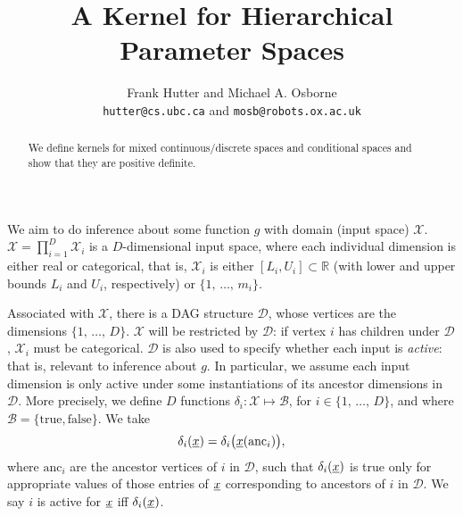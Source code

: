\documentclass[letterpaper]{article}
\newcommand{\vect}[1]{\underline{\smash{#1}}}
\renewcommand{\v}[1]{\vect{#1}}
\newcommand{\reals}{\mathds{R}}
\newcommand{\sX}{\mathcal{X}}
\newcommand{\sD}{\mathcal{D}}
\begin{document}
\title{A Kernel for Hierarchical Parameter Spaces}

\author{Frank Hutter and Michael A. Osborne\\
{\tt hutter@cs.ubc.ca} and {\tt mosb@robots.ox.ac.uk}
}

\maketitle
\begin{abstract}
\noindent{}We define kernels for mixed continuous/discrete spaces and conditional spaces and show that they are positive definite.
\end{abstract}

We aim to do inference about some function $g$ with domain (input space) $\sX$. $\sX = \prod_{i=1}^D \sX_i$ is a $D$-dimensional input space, where each individual dimension is either real or categorical, that is, $\sX_i$ is either $[L_i, U_i] \subset \reals$ (with lower and upper bounds $L_i$ and $U_i$, respectively) or $\{1,\,\ldots,\,m_i\}$. 

Associated with $\sX$, there is a DAG structure $\sD$, whose vertices are the dimensions $\{1,\,\ldots,\,D\}$. $\sX$ will be restricted by $\sD$: if vertex $i$ has children under $\sD$, $\sX_i$ must be categorical. $\sD$ is also used to specify whether each input is \emph{active}: that is, relevant to inference about $g$. In particular, we assume each input dimension is only active under some instantiations of its ancestor dimensions in $\sD$. More precisely, we define $D$ functions $\delta_i\colon \sX\mapsto \mathcal{B}$, for $i \in \{1,\,\ldots,\,D\}$, and where $\mathcal{B} = \{\text{true}, \text{false}\}$. We take 
\begin{equation}
 \delta_i(\v{x}) = \delta_i\bigl(\v{x}(\text{anc}_i)\bigr),
\end{equation}
where $\text{anc}_i$ are the ancestor vertices of $i$ in $\sD$, such that $\delta_i(\v{x})$ is true only for appropriate values of those entries of $\v{x}$ corresponding to ancestors of $i$ in $\sD$. We say $i$ is active for $\v{x}$ iff $\delta_i(\v{x})$.
\end{document}
